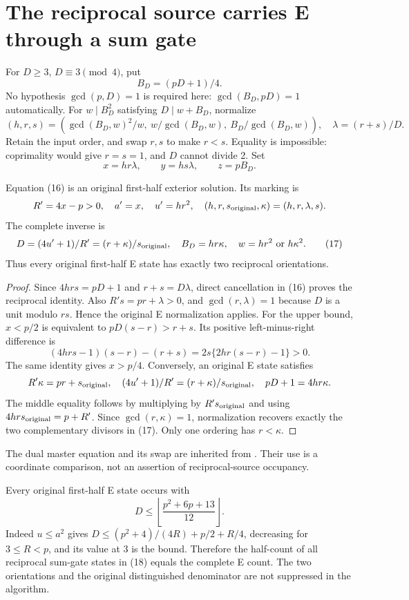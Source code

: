 \section{The reciprocal source carries E through a sum gate}
For $D\ge3$, $D\equiv3\pmod4$, put
\[
 B_D=(pD+1)/4.
\]
No hypothesis $\gcd(p,D)=1$ is required here: $\gcd(B_D,pD)=1$ automatically.
For $w\mid B_D^2$ satisfying $D\mid w+B_D$, normalize
\[
 (h,r,s)=(\gcd(B_D,w)^2/w,\ w/\gcd(B_D,w),\ B_D/\gcd(B_D,w)),
 \quad \lambda=(r+s)/D.
\]
Retain the input order, and swap $r,s$ to make $r<s$. Equality is impossible:
coprimality would give $r=s=1$, and $D$ cannot divide 2. Set
\[
 x=hr\lambda,\qquad y=hs\lambda,\qquad z=pB_D.             \tag{16}
\]
\begin{theorem}\label{thm:dual}
Equation (16) is an original first-half exterior solution. Its marking is
\[
 R'=4x-p>0,\quad a'=x,\quad u'=hr^2,
 \quad(h,r,s_{\rm original},\kappa)=(h,r,\lambda,s).
\]
The complete inverse is
\[
 D=(4u'+1)/R'=(r+\kappa)/s_{\rm original},\quad
 B_D=hr\kappa,\quad w=hr^2\ \hbox{or}\ h\kappa^2.         \tag{17}
\]
Thus every original first-half E state has exactly two reciprocal orientations.
\end{theorem}
\begin{proof}
Since $4hrs=pD+1$ and $r+s=D\lambda$, direct cancellation in (16) proves the
reciprocal identity. Also $R's=pr+\lambda>0$, and $\gcd(r,\lambda)=1$ because
$D$ is a unit modulo $rs$. Hence the original E normalization applies.
For the upper bound, $x<p/2$ is equivalent to $pD(s-r)>r+s$. Its positive
left-minus-right difference is
\[
 (4hrs-1)(s-r)-(r+s)=2s\{2hr(s-r)-1\}>0.
\]
The same identity gives $x>p/4$. Conversely, an original E state satisfies
\[
 R'\kappa=pr+s_{\rm original},\quad
 (4u'+1)/R'=(r+\kappa)/s_{\rm original},\quad
 pD+1=4hr\kappa.
\]
The middle equality follows by multiplying by $R's_{\rm original}$ and using
$4hr s_{\rm original}=p+R'$. Since $\gcd(r,\kappa)=1$, normalization recovers
exactly the two complementary divisors in (17). Only one ordering has $r<\kappa$.
\end{proof}
The dual master equation and its swap are inherited from \cite[\S\S1--4]{BryanDual}.
Their use is a coordinate comparison, not an assertion of reciprocal-source occupancy.

Every original first-half E state occurs with
\[
 D\le\left\lfloor\frac{p^2+6p+13}{12}\right\rfloor.       \tag{18}
\]
Indeed $u\le a^2$ gives
$D\le(p^2+4)/(4R)+p/2+R/4$, decreasing for $3\le R<p$, and its value at 3
is the bound. Therefore the half-count of all reciprocal sum-gate states in (18)
equals the complete E count. The two orientations and the original distinguished
denominator are not suppressed in the algorithm.


